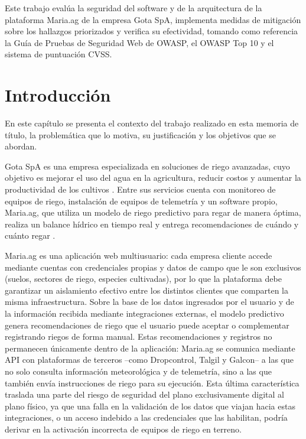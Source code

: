 \documentclass[12pt,letterpaper]{report}
\begin{document}
Este trabajo evalúa la seguridad del software y de la arquitectura de la
plataforma Maria.ag de la empresa Gota SpA, implementa medidas de mitigación
sobre los hallazgos priorizados y verifica su efectividad, tomando como
referencia la Guía de Pruebas de Seguridad Web de OWASP, el OWASP Top 10 y el
sistema de puntuación CVSS.

\newpage

\chapter*{Introducción}

En este capítulo se presenta el contexto del trabajo realizado en esta memoria
de título, la problemática que lo motiva, su justificación y los objetivos que
se abordan.

Gota SpA es una empresa especializada en soluciones de riego avanzadas, cuyo
objetivo es mejorar el uso del agua en la agricultura, reducir costos y
aumentar la productividad de los cultivos \autocite{gota}. Entre sus servicios
cuenta con monitoreo de equipos de riego, instalación de equipos de telemetría
y un software propio, Maria.ag, que utiliza un modelo de riego predictivo para
regar de manera óptima, realiza un balance hídrico en tiempo real y entrega
recomendaciones de cuándo y cuánto regar \autocite{gota,gota2024maria}.

Maria.ag es una aplicación web multiusuario: cada empresa cliente accede
mediante cuentas con credenciales propias y datos de campo que le son
exclusivos (suelos, sectores de riego, especies cultivadas), por lo que la
plataforma debe garantizar un aislamiento efectivo entre los distintos
clientes que comparten la misma infraestructura. Sobre la base de los datos
ingresados por el usuario y de la información recibida mediante integraciones
externas, el modelo predictivo genera recomendaciones de riego que el usuario
puede aceptar o complementar registrando riegos de forma manual. Estas
recomendaciones y registros no permanecen únicamente dentro de la aplicación:
Maria.ag se comunica mediante API con plataformas de terceros --como
Dropcontrol, Talgil y Galcon-- a las que no solo consulta información
meteorológica y de telemetría, sino a las que también envía instrucciones de
riego para su ejecución. Esta última característica traslada una parte del
riesgo de seguridad del plano exclusivamente digital al plano físico, ya que
una falla en la validación de los datos que viajan hacia estas integraciones,
o un acceso indebido a las credenciales que las habilitan, podría derivar en
la activación incorrecta de equipos de riego en terreno.
\end{document}
